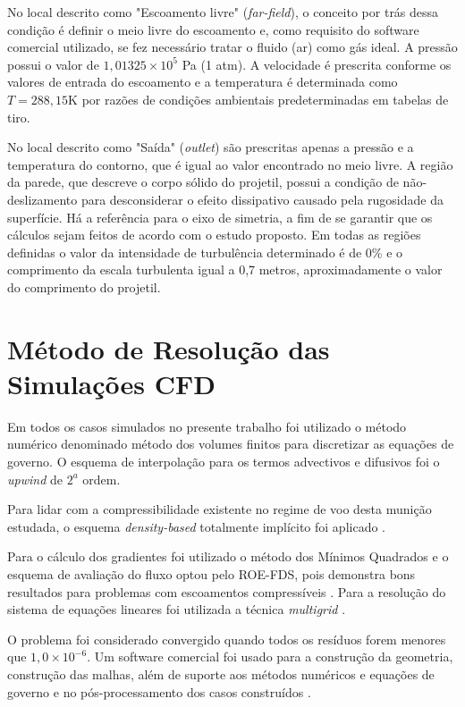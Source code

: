 No local descrito como "Escoamento livre"{} (\textit{far-field}), o conceito por trás dessa condição é definir o meio livre do escoamento e, como requisito do software comercial utilizado, se fez necessário tratar o fluido (ar) como gás ideal. A pressão possui o valor de $1,01325 \times 10^{5}$ Pa (1 atm). A velocidade é prescrita conforme os valores de entrada do escoamento e a temperatura é determinada como $T = 288,15 \text{K}$ por razões de condições ambientais predeterminadas em tabelas de tiro.

No local descrito como "Saída"{} (\textit{outlet}) são prescritas apenas a pressão e a temperatura do contorno, que é igual ao valor encontrado no meio livre. A região da parede, que descreve o corpo sólido do projetil, possui a condição de não-deslizamento para desconsiderar o efeito dissipativo causado pela rugosidade da superfície. Há a referência para o eixo de simetria, a fim de se garantir que os cálculos sejam feitos de acordo com o estudo proposto. Em todas as regiões definidas o valor da intensidade de turbulência determinado é de 0\% e o comprimento da escala turbulenta igual a 0,7 metros, aproximadamente o valor do comprimento do projetil.

\section{Método de Resolução das Simulações CFD}\label{sec:metodo-resolucao-cfd}

Em todos os casos simulados no presente trabalho foi utilizado o método numérico denominado método dos volumes finitos \cite{McDonald1971,MacComarck&Paulay1972} para discretizar as equações de governo. O esquema de interpolação para os termos advectivos e difusivos foi o \textit{upwind} de $2^{a}$ ordem. 

Para lidar com a compressibilidade existente no regime de voo desta munição estudada, o esquema \textit{density-based} totalmente implícito foi aplicado \cite{Weiss1995PreconditioningAT,Weiss1997IMPLICITSO,Weiss1999ImplicitSO}.

Para o cálculo dos gradientes foi utilizado o método dos Mínimos Quadrados e o esquema de avaliação do fluxo optou pelo ROE-FDS, pois demonstra bons resultados para problemas com escoamentos compressíveis \cite{nicolas-perez_accuracy_2017}. Para a resolução do sistema de equações lineares foi utilizada a técnica \textit{multigrid} \cite{Hutchinson1986}.

O problema foi considerado convergido quando todos os resíduos forem menores que $1,0 \times 10^{-6}$. Um software comercial foi usado para a construção da geometria, construção das malhas, além de suporte aos métodos numéricos e equações de governo e no pós-processamento dos casos construídos \cite{fluent2021ansys}.

